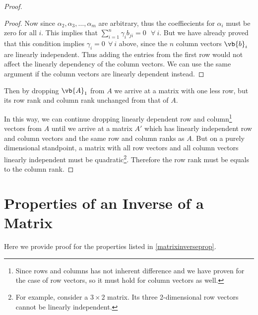 \documentclass[a4paper,12pt]{report}
\begin{document}
\begin{appendices}
\begin{proof}
\begin{proof}
    Now since \(\alpha _{2}, \alpha _{3}, \ldots , \alpha _{m}\) are arbitrary, thus the coeffiecients for \(\alpha _{i} \) must be zero for all \(i\). This implies that \(\sum_{i=1}^{n} \gamma _{i} b_{ji} = 0 ~~~\forall~ i\). But we have already proved that this condition implies \(\gamma _{i} = 0 ~~\forall~ i \) above, since the \(n\) column vectors \(\vb{b} _{i} \) are linearly independent. Thus adding the entries from the first row would not affect the linearly dependency of the column vectors. We can use the same argument if the column vectors are linearly dependent instead.
    \end{proof}
    
    Then by dropping \(\vb{A} _{1} \) from \(A\) we arrive at a matrix with one less row, but its row rank and column rank unchanged from that of \(A\).
        
    In this way, we can continue dropping linearly dependent row and column\footnote{Since rows and columns has not inherent difference and we have proven for the case of row vectors, so it must hold for column vectors as well.}  vectors from \(A\) until we arrive at a matrix \(A'\) which has linearly independent row and column vectors and the same row and column ranks as \(A\). But on a purely dimensional standpoint, a matrix with all row vectors and all column vectors linearly independent must be quadratic\footnote{For example, consider a \(3 \times 2\) matrix. Its three 2-dimensional row vectors cannot be linearly independent.}. Therefore the row rank must be equals to the column rank.
\end{proof}

\section{Properties of an Inverse of a Matrix} \label{matrixinversepropapp} 

Here we provide proof for the properties listed in \cref{matrixinverseprop}.


\end{appendices}
\end{document}
